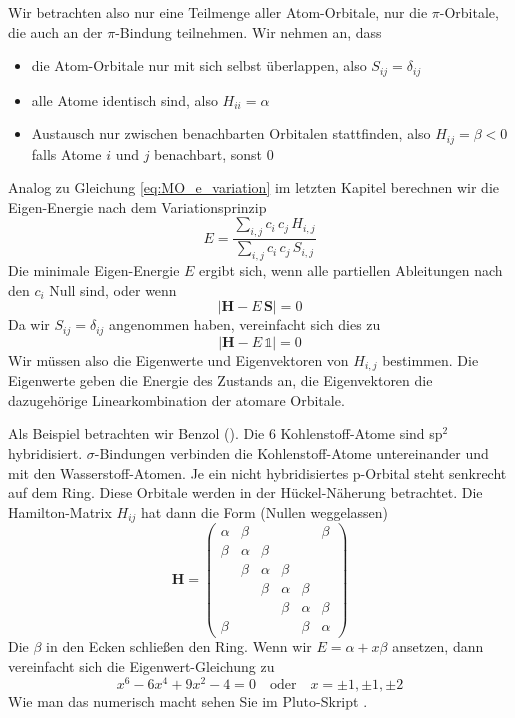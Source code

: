 Wir betrachten also nur eine Teilmenge aller Atom-Orbitale, nur die $\pi$-Orbitale, die auch an der $\pi$-Bindung teilnehmen. Wir nehmen an, dass
\begin{itemize} \setlength{\itemsep}{0pt}
\item die Atom-Orbitale nur mit sich selbst überlappen, also $S_{ij} = \delta_{ij}$
\item alle Atome identisch sind, also $H_{ii} = \alpha$
\item Austausch nur zwischen benachbarten Orbitalen stattfinden, also  $H_{ij} = \beta < 0 $ falls Atome $i$ und $j$ benachbart, sonst $0$ 
\end{itemize}

Analog zu Gleichung \ref{eq:MO_e_variation} im letzten Kapitel berechnen wir die Eigen-Energie nach dem Variationsprinzip
\begin{equation}
 E = \frac{  \sum_{i,j} c_i \, c_j \, H_{i,j} }{ \sum_{i,j} c_i \, c_j \, S_{i,j} }
\end{equation}
Die minimale Eigen-Energie $E$ ergibt sich, wenn alle partiellen Ableitungen nach den $c_i$ Null sind, oder wenn
\begin{equation}
 \left| \mathbf{H} - E \, \mathbf{S}\right| = 0
\end{equation}
Da wir $S_{ij} = \delta_{ij}$ angenommen haben, vereinfacht sich dies zu 
\begin{equation}
 \left| \mathbf{H} - E \, \mathds{1} \right| = 0
\end{equation}
Wir müssen also die Eigenwerte und Eigenvektoren von $H_{i,j}$ bestimmen. Die Eigenwerte geben die Energie des Zustands an, die Eigenvektoren die dazugehörige  Linearkombination der atomare Orbitale.


Als Beispiel betrachten wir Benzol (). Die 6 Kohlenstoff-Atome sind sp$^2$ hybridisiert. $\sigma$-Bindungen verbinden die Kohlenstoff-Atome untereinander und mit den Wasserstoff-Atomen. Je ein nicht hybridisiertes p-Orbital steht senkrecht auf dem Ring. Diese Orbitale werden in der Hückel-Näherung betrachtet. Die Hamilton-Matrix $H_{ij}$ hat dann die Form (Nullen weggelassen)
\begin{equation}
\mathbf{H} = 
 \begin{pmatrix}
  \alpha  & \beta &  &  &  & \beta \\
  \beta & \alpha  & \beta & & & \\
  & \beta & \alpha  & \beta & & \\
 &  & \beta & \alpha & \beta & \\
&  &  & \beta & \alpha & \beta \\
\beta & &  &  & \beta & \alpha 
 \end{pmatrix} 
\end{equation}
Die $\beta$ in den Ecken schließen den Ring.
Wenn wir $E = \alpha + x \beta$ ansetzen, dann vereinfacht sich die Eigenwert-Gleichung zu 
\begin{equation}
x^6 - 6 x^4 + 9x^2 - 4 = 0 \quad \text{oder} \quad x = \pm 1, \pm 1, \pm 2
\end{equation}
Wie man das numerisch macht sehen Sie im  Pluto-Skript .





